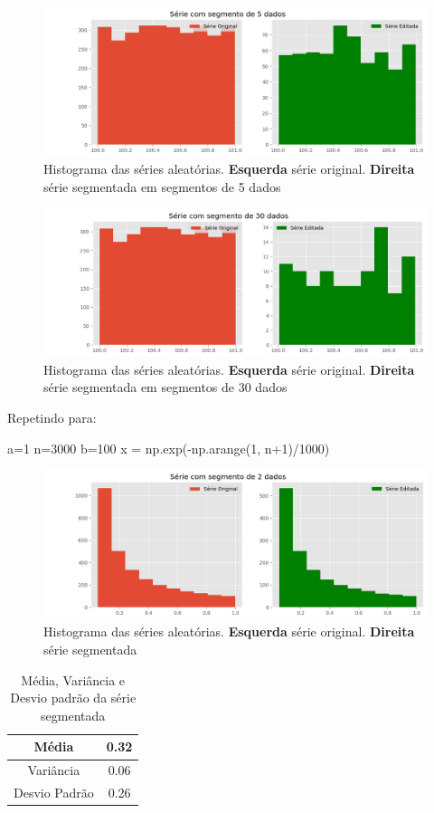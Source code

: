 \documentclass[12pt,a4paper,portuguese]{article}
\begin{document}
	\begin{figure}[H]
		\centering
		\includegraphics[width=0.9\linewidth]{lista2-2d}
		\caption{Histograma das séries aleatórias. \textbf{Esquerda} série original. \textbf{Direita} série segmentada em segmentos de 5 dados}
		\label{fig:lista2-2d}
	\end{figure}
	
	
	\begin{figure}[H]
		\centering
		\includegraphics[width=0.9\linewidth]{lista2-2e}
		\caption{Histograma das séries aleatórias. \textbf{Esquerda} série original. \textbf{Direita} série segmentada em segmentos de 30 dados}
		\label{fig:lista2-2e}
	\end{figure}
	
	
	Repetindo para:
	\begin{python}
a=1
n=3000
b=100
x = np.exp(-np.arange(1, n+1)/1000)
	\end{python}
	\begin{figure}[H]
		\centering
		\includegraphics[width=0.9\linewidth]{lista2-3c}
		\caption{Histograma das séries aleatórias. \textbf{Esquerda} série original. \textbf{Direita} série segmentada}
		\label{fig:lista2-3c}
	\end{figure}
	\begin{table}[H]
		\centering
		\begin{tabular}{|c|c|}
			\hline
			Média & 0.32\\
			\hline
			Variância & 0.06\\
			\hline
			Desvio Padrão &0.26\\
			\hline
		\end{tabular}
		\caption{Média, Variância e Desvio padrão da série segmentada}
		\label{y2}
	\end{table}
	
\end{document}
